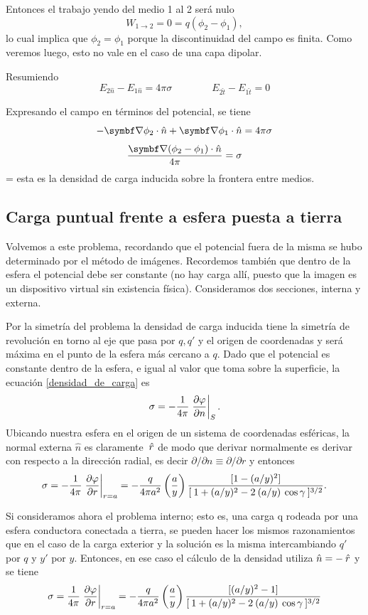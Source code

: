 \documentclass[10pt,oneside]{CBFT_book}
\begin{document}
Entonces el trabajo yendo del medio 1 al 2 será nulo
\[
	W_{1\to 2} = 0 = q ( \phi_2 - \phi_1 ),
\]
lo cual implica que $\phi_2 = \phi_1$ porque la discontinuidad del campo es finita.
Como veremos luego, esto no vale en el caso de una capa dipolar.

Resumiendo
\[
	E_{2\hat{n}} - E_{1\hat{n}} = 4 \pi \sigma \qquad \qquad E_{2\hat{t}} -E_{1\hat{t}} = 0
\]

Expresando el campo en términos del potencial, se tiene
\[
	-\Nabla\phi_2\cdot\hat{n} + \Nabla\phi_1\cdot\hat{n} = 4 \pi \sigma
\]
\[
	\frac{\Nabla(\phi_2-\phi_1)\cdot \hat{n}}{4 \pi} = \sigma
\]
\be
	\sigma = 
	\label{densidad_de_carga}
\ee
esta es la densidad de carga inducida sobre la frontera entre medios.

\subsection{Carga puntual frente a esfera puesta a tierra}

Volvemos a este problema, recordando que el potencial fuera de la misma se hubo determinado por el método
de imágenes. Recordemos también que dentro de la esfera el potencial debe ser constante (no hay carga allí,
puesto que la imagen es un dispositivo virtual sin existencia física).
Consideramos dos secciones, interna y externa.

Por la simetría del problema la densidad de carga inducida tiene la simetría de revolución en torno al 
eje que pasa por $q, q'$ y el origen de coordenadas y será máxima en el punto de la esfera más cercano a
$q$.
Dado que el potencial es constante dentro de la esfera, e igual al valor que toma sobre la superficie, la
ecuación \eqref{densidad_de_carga} es 
\[
	\sigma = - \frac{1}{4\pi} \left.\frac{\partial^{\hspace{-0.05em}} {\varphi}}{\partial {n}^{\hspace{-0.05em}}}\right|_S.
\]
Ubicando nuestra esfera en el origen de un sistema de coordenadas esféricas, la normal externa $\hat{n}$
es claramente $\:\hat{r}$ de modo que derivar normalmente es derivar con respecto a la dirección radial, es 
decir $\partial / \partial n \equiv \partial / \partial r$ y entonces 
\[
	\sigma = - \frac{1}{4\pi} \left.\frac{\partial^{\hspace{-0.05em}} {\varphi}}{\partial {r}^{\hspace{-0.05em}}}\right|_{r=a} =
	- \frac{q}{4 \pi a^2} \left( \frac{ a }{ y } \right) 
	\frac{[ 1 - (a / y)^2 ]}{[\: 1 + (a / y)^2 - 2 \: (a/y) \: \cos \gamma \:]^{3/2}}.
\]

Si consideramos ahora el problema interno; esto es, una carga q rodeada por una esfera conductora conectada
a tierra, se pueden hacer los mismos razonamientos que en el caso de la carga exterior y la solución es la
misma intercambiando $q'$ por $q$ y $y'$ por $y$.
Entonces, en ese caso el cálculo de la densidad utiliza $\hat{n} = -\:\hat{r}$ y se tiene 
\[
	\sigma = \frac{1}{4\pi} \left.\frac{\partial^{\hspace{-0.05em}} {\varphi}}{\partial {r}^{\hspace{-0.05em}}}\right|_{r=a} =
	- \frac{q}{4 \pi a^2} \left( \frac{ a }{ y } \right) 
	\frac{[ (a / y)^2 - 1 ]}{[\: 1 + (a / y)^2 - 2 \: (a/y) \: \cos \gamma \:]^{3/2}}
\]
\end{document}
